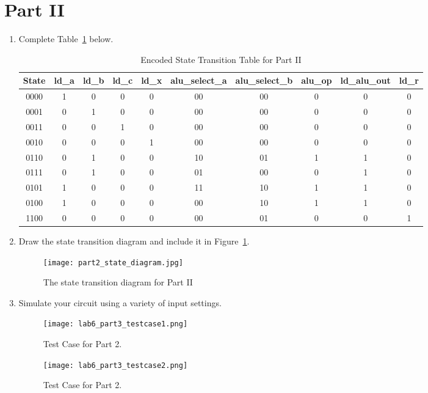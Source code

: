 \documentclass{article}
\begin{document}
\clearpage
\section{Part II}

\begin{enumerate}
\item Complete Table~\ref{t:part2_encoded_transition_table} below.

\begin{table}[ht!]
\caption{Encoded State Transition Table for Part II}
\label{t:part2_encoded_transition_table}
\centering
\begin{tabular}{|c|c|c|c|c|c|c|c|c|c|}
\hline
State & ld\_a & ld\_b & ld\_c & ld\_x & alu\_select\_a & alu\_select\_b & alu\_op & ld\_alu\_out & ld\_r \\ 
\hline

0000    & 1 & 0 & 0 & 0 & 00 & 00 & 0 & 0 & 0 \\ \hline
0001    & 0 & 1 & 0 & 0 & 00 & 00 & 0 & 0 & 0 \\ \hline
0011    & 0 & 0 & 1 & 0 & 00 & 00 & 0 & 0 & 0 \\ \hline
0010    & 0 & 0 & 0 & 1 & 00 & 00 & 0 & 0 & 0 \\ \hline
0110    & 0 & 1 & 0 & 0 & 10 & 01 & 1 & 1 & 0 \\ \hline
0111    & 0 & 1 & 0 & 0 & 01 & 00 & 0 & 1 & 0 \\ \hline
0101    & 1 & 0 & 0 & 0 & 11 & 10 & 1 & 1 & 0 \\ \hline
0100    & 1 & 0 & 0 & 0 & 00 & 10 & 1 & 1 & 0 \\ \hline
1100    & 0 & 0 & 0 & 0 & 00 & 01 & 0 & 0 & 1 \\ \hline

\end{tabular}
\end{table}


\item Draw the state transition diagram and include it in Figure~\ref{f:part2_state_diagram}.

\begin{figure}[ht!]
    \centering
    \texttt{[image: part2\_state\_diagram.jpg]}
    \caption{The state transition diagram for Part II}
    
    \label{f:part2_state_diagram}
\end{figure}



    \item Simulate your circuit using a variety of input settings.
        
    \begin{figure}[ht!]
    \centering
    \texttt{[image: lab6\_part3\_testcase1.png]}
    \caption{Test Case for Part 2.}
    \label{f:part2_testcase 1}
\end{figure}
    \begin{figure}[ht!]
    \centering
    \texttt{[image: lab6\_part3\_testcase2.png]}
    \caption{Test Case for Part 2.}
    \label{f:part2_testcase 2}
\end{figure}

\end{enumerate}
\end{document}
